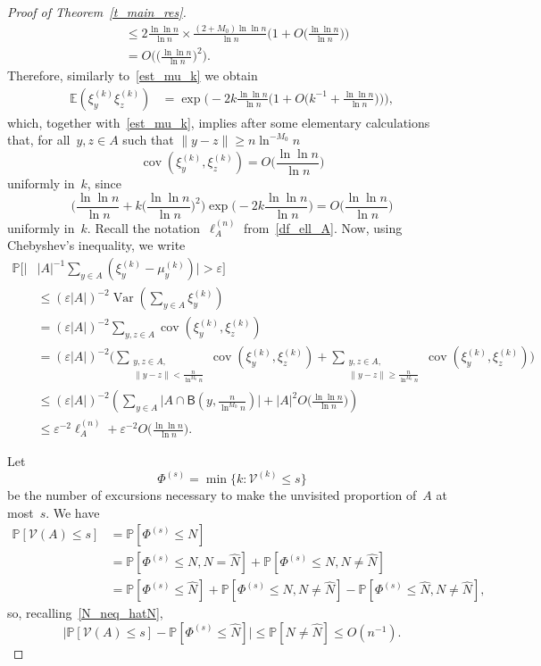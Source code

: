 \documentclass[10pt]{amsart}
\theoremstyle{definition}\newtheorem{defi}[theo]{Definition}\newtheorem{rema}[theo]{Remark}\newtheorem{exam}[theo]{Example}\newtheorem{exem}[theo]{Example}\newtheorem{nota}[theo]{Notation}
\DeclareMathOperator{\cov}{cov}
\DeclareMathOperator{\Var}{Var}
\newcommand{\1}[1]{{\mathbf 1}{\{#1\}}}
\newcommand{\eps}{\varepsilon}
\newcommand{\V}{{\mathcal V}}
\newcommand{\hN}{{\widehat N}}
\newcommand{\8}{{\infty}}
\newcommand{\IP}{{\mathbb P}}
\newcommand{\IE}{{\mathbb E}}
\newcommand{\B}{{\mathsf B}}
\begin{document}
\begin{proof}[Proof of Theorem~\ref{t_main_res}]
\begin{align*}
&\leq 2\frac{\ln\ln n}{\ln n} \times \frac{(2+M_0)\ln\ln n}{\ln n}
\Big(1+O\Big(\frac{\ln\ln n}{\ln n}\Big)\Big)\\
&= O\Big(\Big(\frac{\ln\ln n}{\ln n}\Big)^2\Big).
\end{align*}
Therefore, similarly to~\eqref{est_mu_k} we obtain
\begin{align*}
\IE(\xi_y^{(k)}\xi_z^{(k)}) &= \exp\Big(-2k\frac{\ln\ln n}{\ln n}
\Big(1+O\Big(k^{-1}+\frac{\ln\ln n}{\ln n}\Big)\Big)\Big),
\end{align*}
which, together with~\eqref{est_mu_k}, implies after some elementary calculations that, for all~$y,z\in A$ such that $\|y-z\|\geq n\ln^{-M_0}n$
\begin{equation}\label{est_cov}
\cov (\xi_y^{(k)},\xi_z^{(k)}) = O\Big(\frac{\ln\ln n}{\ln n}\Big)
\end{equation}
uniformly in~$k$, since
\[
\Bigg(\frac{\ln\ln n}{\ln n} + k\Big(\frac{\ln\ln n}{\ln n}\Big)^2
\Bigg) \exp\Big(-2k\frac{\ln\ln n}{\ln n}\Big) = O\Big(\frac{\ln\ln n}{\ln n}\Big)
\]
uniformly in~$k$. Recall the notation~$\ell^{(n)}_A$ from~\eqref{df_ell_A}. Now, using Chebyshev's inequality, we write
\begin{align}
\IP\Big[\Big|&|A|^{-1}\sum_{y\in A}(\xi_y^{(k)} -\mu_y^{(k)})\Big|>\eps\Big]\nonumber\\
&\leq (\eps|A|)^{-2} \Var \left(\sum_{y\in A}\xi_y^{(k)}\right)
\nonumber\\
&= (\eps|A|)^{-2} \sum_{y,z\in A}\cov (\xi_y^{(k)},\xi_z^{(k)})
\nonumber\\
&= (\eps|A|)^{-2} \Bigg(\sum_{\substack{y,z\in A,\\
\|y-z\|< \frac{n}{\ln^{M_0}n}}} \cov (\xi_y^{(k)},\xi_z^{(k)}) + \sum_{\substack{y,z\in A,\\
\|y-z\|\geq \frac{n}{\ln^{M_0}n}}}
\cov (\xi_y^{(k)},\xi_z^{(k)}) \Bigg)
\nonumber\\
&\leq (\eps|A|)^{-2} \left(\sum_{y\in A} \big|A\cap \B(y,\tfrac{n}{\ln^{M_0}n})\big| + |A|^2 O\Big(\frac{\ln\ln n}{\ln n}\Big) \right)\nonumber\\
&\leq \eps^{-2}
\ell^{(n)}_A + \eps^{-2} O\Big(\frac{\ln\ln n}{\ln n} \Big).\label{bigcalc_Cheb}
\end{align}

Let
\[
\Phi^{(s)} = \min\big\{k: \V^{(k)}\leq s\big\}
\]
be the number of excursions necessary to make the unvisited proportion of~$A$ at most~$s$. We have
\begin{align*}
\IP[\V(A)\leq s] & = \IP[\Phi^{(s)}\leq N]\\
&= \IP[\Phi^{(s)}\leq N,N=\hN] +
\IP[\Phi^{(s)}\leq N,N\neq \hN]\\
&= \IP[\Phi^{(s)}\leq \hN] + \IP[\Phi^{(s)}\leq N,N\neq \hN] - \IP[\Phi^{(s)}\leq \hN,N\neq \hN],
\end{align*}
so, recalling~\eqref{N_neq_hatN},
\begin{equation}\label{V_Phi_hatN}
\big|\IP[\V(A)\leq s] - \IP[\Phi^{(s)}\leq \hN]\big|
\leq \IP[N\neq \hN] \leq O(n^{-1}).
\end{equation}


\end{proof}
\end{document}
